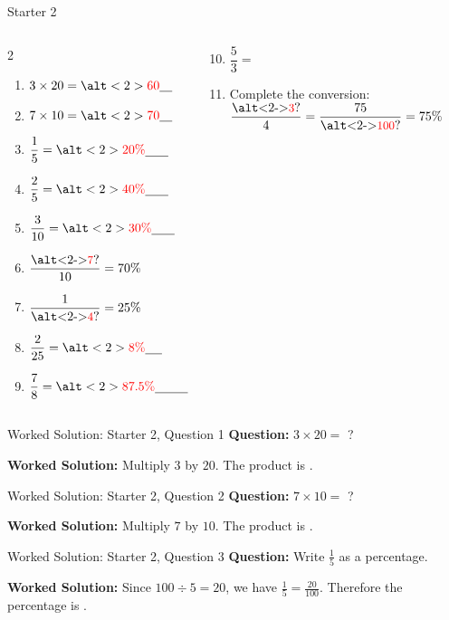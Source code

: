 \documentclass{beamer}
\newcommand{\ablank}[1]{%
  \alt<2>{\textcolor{red}{#1}}{\underline{\phantom{#1}}}%
}
\newcommand{\ashowq}[1]{\alt<2->{\textcolor{red}{\small #1}}{?}}
\begin{document}
\begin{frame}[t]{Starter 2}
\begin{columns}
\vspace{-2em}
\begin{multicols}{2}
\begin{enumerate}
   \setlength{\itemsep}{12pt}
  \item $3 \times 20 = \ablank{60}$
  \item $7 \times 10 = \ablank{70}$
  \item $\dfrac{1}{5} = \ablank{20\%}$
  \item $\dfrac{2}{5} = \ablank{40\%}$
  \item $\dfrac{3}{10} = \ablank{30\%}$
  \item $\dfrac{\text{\ashowq{7}}}{10} = 70\%$
  \item $\dfrac{1}{\text{\ashowq{4}}} = 25\%$
  \item $\dfrac{2}{25} = \ablank{8\%}$
  \item $\dfrac{7}{8} = \ablank{87.5\%}$
  \end{enumerate}
\end{multicols}
\begin{center}
  \begin{enumerate}
  \setcounter{enumi}{9}
  \item $\dfrac{5}{3}={}$\ablank{$166.\dot{6}\%$}
  \vspace{0.6em}
  \item Complete the conversion: \\[2pt]
        $\dfrac{\text{\ashowq{3}}}{4} = \dfrac{75}{\text{\ashowq{100}}} = 75\%$
\end{enumerate}
\end{center}


\end{columns}
\end{frame}

\begin{frame}[t]{Worked Solution: Starter 2, Question 1}
\hypertarget{work-st2}{}
\textbf{Question:} \(3 \times 20 =\) ?

\smallskip
\textbf{Worked Solution:} Multiply \(3\) by \(20\). The product is \ablank{$60$}.
\end{frame}

\begin{frame}[t]{Worked Solution: Starter 2, Question 2}
\textbf{Question:} \(7 \times 10 =\) ?

\smallskip
\textbf{Worked Solution:} Multiply \(7\) by \(10\). The product is \ablank{$70$}.
\end{frame}

\begin{frame}[t]{Worked Solution: Starter 2, Question 3}
\textbf{Question:} Write \(\frac{1}{5}\) as a percentage.

\smallskip
\textbf{Worked Solution:} Since \(100 \div 5 = 20\), we have \(\frac{1}{5} = \frac{20}{100}\). Therefore the percentage is \ablank{$20\%$}.
\end{frame}
\end{document}
